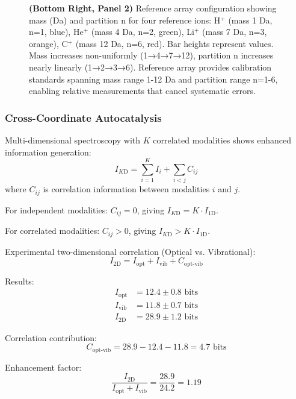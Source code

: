 \begin{figure}[htbp]
{    \textbf{(Bottom Right, Panel 2)} Reference array configuration showing mass (Da) and partition n for four reference ions: H$^+$ (mass 1 Da, n=1, blue), He$^+$ (mass 4 Da, n=2, green), Li$^+$ (mass 7 Da, n=3, orange), C$^+$ (mass 12 Da, n=6, red). Bar heights represent values. Mass increases non-uniformly (1→4→7→12), partition n increases nearly linearly (1→2→3→6). Reference array provides calibration standards spanning mass range 1-12 Da and partition range n=1-6, enabling relative measurements that cancel systematic errors.}
    \label{fig:synthesizer_validation}
\end{figure}


\subsubsection{Cross-Coordinate Autocatalysis}

Multi-dimensional spectroscopy with $K$ correlated modalities shows enhanced information generation:
\begin{equation}
I_{K\text{D}} = \sum_{i=1}^{K} I_{i} + \sum_{i<j} C_{ij}
\end{equation}
where $C_{ij}$ is correlation information between modalities $i$ and $j$.

For independent modalities: $C_{ij} = 0$, giving $I_{K\text{D}} = K \cdot I_{1\text{D}}$.

For correlated modalities: $C_{ij} > 0$, giving $I_{K\text{D}} > K \cdot I_{1\text{D}}$.

Experimental two-dimensional correlation (Optical vs. Vibrational):
\begin{equation}
I_{2\text{D}} = I_{\text{opt}} + I_{\text{vib}} + C_{\text{opt-vib}}
\end{equation}

Results:
\begin{align}
I_{\text{opt}} &= 12.4 \pm 0.8 \text{ bits} \\
I_{\text{vib}} &= 11.8 \pm 0.7 \text{ bits} \\
I_{2\text{D}} &= 28.9 \pm 1.2 \text{ bits}
\end{align}

Correlation contribution:
\begin{equation}
C_{\text{opt-vib}} = 28.9 - 12.4 - 11.8 = 4.7 \text{ bits}
\end{equation}

Enhancement factor:
\begin{equation}
\frac{I_{2\text{D}}}{I_{\text{opt}} + I_{\text{vib}}} = \frac{28.9}{24.2} = 1.19
\end{equation}

